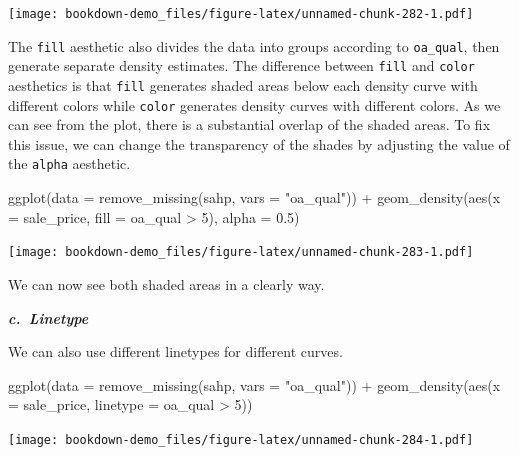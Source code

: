 \documentclass[
]{book}
\newenvironment{Shaded}{\begin{snugshade}}{\end{snugshade}}
\newcommand{\AttributeTok}[1]{\textcolor[rgb]{0.77,0.63,0.00}{#1}}
\newcommand{\DecValTok}[1]{\textcolor[rgb]{0.00,0.00,0.81}{#1}}
\newcommand{\FloatTok}[1]{\textcolor[rgb]{0.00,0.00,0.81}{#1}}
\newcommand{\FunctionTok}[1]{\textcolor[rgb]{0.00,0.00,0.00}{#1}}
\newcommand{\NormalTok}[1]{#1}
\newcommand{\SpecialCharTok}[1]{\textcolor[rgb]{0.00,0.00,0.00}{#1}}
\newcommand{\StringTok}[1]{\textcolor[rgb]{0.31,0.60,0.02}{#1}}
\begin{document}
\texttt{[image: bookdown-demo\_files/figure-latex/unnamed-chunk-282-1.pdf]}

The \texttt{fill} aesthetic also divides the data into groups according to \texttt{oa\_qual}, then generate separate density estimates. The difference between \texttt{fill} and \texttt{color} aesthetics is that \texttt{fill} generates shaded areas below each density curve with different colors while \texttt{color} generates density curves with different colors. As we can see from the plot, there is a substantial overlap of the shaded areas. To fix this issue, we can change the transparency of the shades by adjusting the value of the \texttt{alpha} aesthetic.

\begin{Shaded}
\begin{Highlighting}[]
\FunctionTok{ggplot}\NormalTok{(}\AttributeTok{data =} \FunctionTok{remove\_missing}\NormalTok{(sahp, }\AttributeTok{vars =} \StringTok{"oa\_qual"}\NormalTok{)) }\SpecialCharTok{+}  \FunctionTok{geom\_density}\NormalTok{(}\FunctionTok{aes}\NormalTok{(}\AttributeTok{x =}\NormalTok{ sale\_price, }\AttributeTok{fill =}\NormalTok{ oa\_qual }\SpecialCharTok{\textgreater{}} \DecValTok{5}\NormalTok{), }\AttributeTok{alpha =} \FloatTok{0.5}\NormalTok{)}
\end{Highlighting}
\end{Shaded}

\texttt{[image: bookdown-demo\_files/figure-latex/unnamed-chunk-283-1.pdf]}

We can now see both shaded areas in a clearly way.

\textbf{\emph{c.~Linetype}}

We can also use different linetypes for different curves.

\begin{Shaded}
\begin{Highlighting}[]
\FunctionTok{ggplot}\NormalTok{(}\AttributeTok{data =} \FunctionTok{remove\_missing}\NormalTok{(sahp, }\AttributeTok{vars =} \StringTok{"oa\_qual"}\NormalTok{)) }\SpecialCharTok{+}  \FunctionTok{geom\_density}\NormalTok{(}\FunctionTok{aes}\NormalTok{(}\AttributeTok{x =}\NormalTok{ sale\_price, }\AttributeTok{linetype =}\NormalTok{ oa\_qual }\SpecialCharTok{\textgreater{}} \DecValTok{5}\NormalTok{))}
\end{Highlighting}
\end{Shaded}

\texttt{[image: bookdown-demo\_files/figure-latex/unnamed-chunk-284-1.pdf]}
\end{document}

